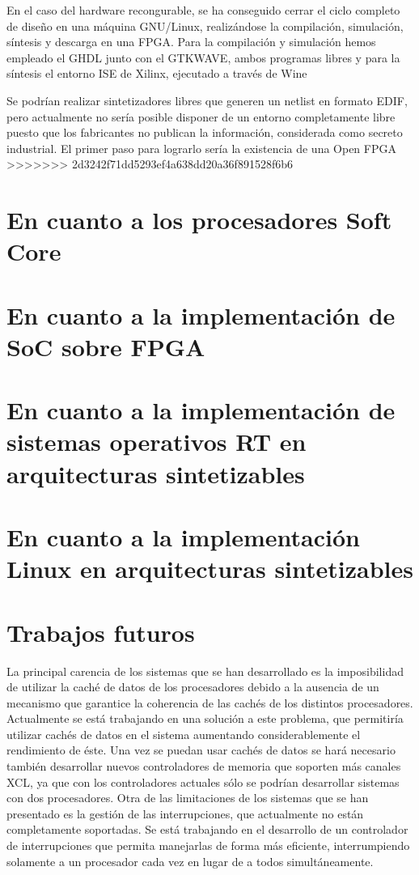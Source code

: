 En el caso del hardware recongurable, se ha conseguido cerrar el ciclo completo de diseño en una máquina GNU/Linux, realizándose la compilación, simulación, síntesis y descarga en una FPGA. Para la compilación y simulación hemos empleado el GHDL junto con el GTKWAVE, ambos programas libres y para la síntesis el entorno ISE de Xilinx, ejecutado a través de Wine

Se podrían realizar sintetizadores libres que generen un netlist en formato EDIF, pero actualmente no sería posible disponer de un entorno completamente libre puesto que los fabricantes no publican la información, considerada como secreto industrial. El primer paso para lograrlo sería la existencia de una Open FPGA
>>>>>>> 2d3242f71dd5293ef4a638dd20a36f891528f6b6
	\section{En cuanto a los procesadores Soft Core} 
	
	
	
	\section{En cuanto a la implementación de SoC sobre FPGA} 
		
		
	\section{En cuanto a la implementación de sistemas operativos RT en arquitecturas sintetizables} 
		
	
	\section{En cuanto a la implementación Linux en arquitecturas sintetizables} 
		


	\section{Trabajos futuros}

La principal carencia de los sistemas que se han desarrollado es la imposibilidad de utilizar la caché de datos de los procesadores debido a la
ausencia de un mecanismo que garantice la coherencia de las cachés de los distintos procesadores. Actualmente se está trabajando en una solución a
este problema, que permitiría utilizar cachés de datos en el sistema aumentando considerablemente el rendimiento de éste. Una vez se puedan usar
cachés de datos se hará necesario también desarrollar nuevos controladores de memoria que soporten más canales XCL, ya que con los controladores
actuales sólo se podrían desarrollar sistemas con dos procesadores. Otra de las limitaciones de los sistemas que se han presentado es la gestión de
las interrupciones, que actualmente no están completamente soportadas. Se está trabajando en el desarrollo de un controlador de interrupciones que
permita manejarlas de forma más eficiente, interrumpiendo solamente a un procesador cada vez en lugar de a todos simultáneamente.


